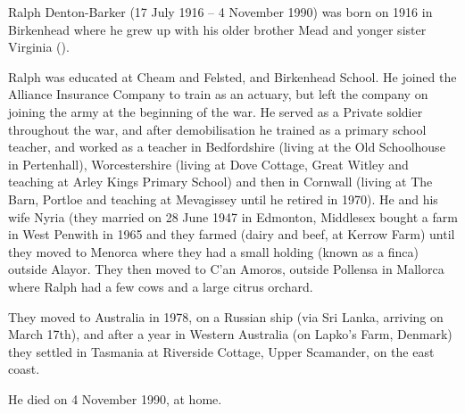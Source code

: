 
Ralph Denton-Barker (17 July 1916 -- 4 November 1990) was born on 1916 in Birkenhead  where he grew up with his older brother Mead and yonger sister Virginia ().

Ralph was educated at Cheam and Felsted, and Birkenhead School. He joined the Alliance Insurance Company to train as an actuary, but left the company on joining the army at the beginning of the war. He served as a Private soldier throughout the war, and after demobilisation he trained as a primary school teacher, and worked as a teacher in Bedfordshire (living at the Old Schoolhouse in Pertenhall), Worcestershire (living at Dove Cottage, Great Witley and teaching at Arley Kings Primary School) and then in Cornwall (living at The Barn, Portloe and teaching at Mevagissey until he retired in 1970). He and his wife Nyria (they married on 28 June 1947 in Edmonton, Middlesex  bought a farm in West Penwith in 1965 and they farmed (dairy and beef, at Kerrow Farm) until they moved to Menorca where they had a small holding (known as a finca) outside Alayor. They then moved to C'an Amoros, outside Pollensa in Mallorca where Ralph had a few cows and a large citrus orchard.

They moved to Australia in 1978, on a Russian ship (via Sri Lanka, arriving on March 17th), and after a year in Western Australia (on Lapko's Farm, Denmark) they settled in Tasmania at Riverside Cottage, Upper Scamander, on the east coast.

He died on 4 November 1990, at home.

\begin{references}




\end{references}

